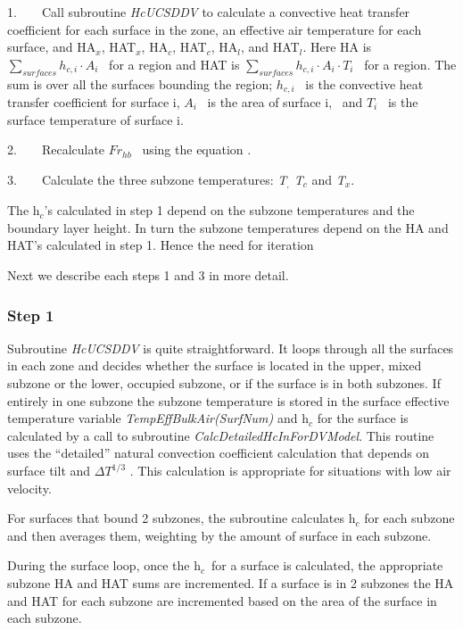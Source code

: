 1.~~~~Call subroutine \emph{HcUCSDDV} to calculate a convective heat transfer coefficient for each surface in the zone, an effective air temperature for each surface, and HA\(_{x}\), HAT\(_{x}\), HA\(_{c}\), HAT\(_{c}\), HA\(_{l}\), and HAT\(_{l}\). Here HA is \(\sum\limits_{surfaces} {{h_{c,i}}} \cdot {A_i}\) ~for a region and HAT is \(\sum\limits_{surfaces} {{h_{c,i}}} \cdot {A_i} \cdot {T_i}\) ~for a region. The sum is over all the surfaces bounding the region; \({h_{c,i}}\) ~is the convective heat transfer coefficient for surface i, \({A_i}\) ~is the area of surface i,~ and \({T_i}\) ~is the surface temperature of surface i.

2.~~~~Recalculate \(F{r_{hb}}\) ~using the equation .

3.~~~~Calculate the three subzone temperatures: \emph{T\(_{,}\) T\(_{c}\)} and \emph{T\(_{x}\)}.

The h\(_{c}\)'s calculated in step 1 depend on the subzone temperatures and the boundary layer height. In turn the subzone temperatures depend on the HA and HAT's calculated in step 1. Hence the need for iteration

Next we describe each steps 1 and 3 in more detail.

\subsubsection{Step 1}\label{step-1}

Subroutine \emph{HcUCSDDV} is quite straightforward. It loops through all the surfaces in each zone and decides whether the surface is located in the upper, mixed subzone or the lower, occupied subzone, or if the surface is in both subzones. If entirely in one subzone the subzone temperature is stored in the surface effective temperature variable \emph{TempEffBulkAir(SurfNum)} and h\(_{c}\) for the surface is calculated by a call to subroutine \emph{CalcDetailedHcInForDVModel}. This routine uses the ``detailed'' natural convection coefficient calculation that depends on surface tilt and \(\Delta {T^{1/3}}\) . This calculation is appropriate for situations with low air velocity.

For surfaces that bound 2 subzones, the subroutine calculates h\(_{c}\) for each subzone and then averages them, weighting by the amount of surface in each subzone.

During the surface loop, once the h\(_{c}\)~for a surface is calculated, the appropriate subzone HA and HAT sums are incremented. If a surface is in 2 subzones the HA and HAT for each subzone are incremented based on the area of the surface in each subzone.

